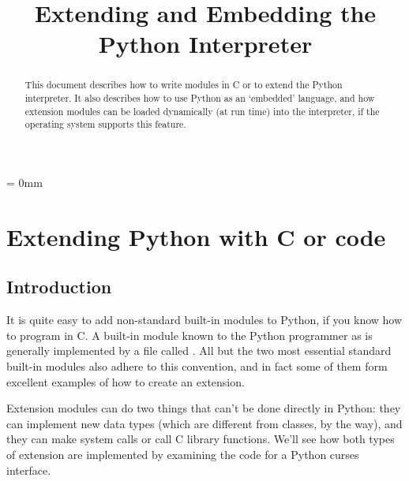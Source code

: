 
\title{Extending and Embedding the Python Interpreter}



\makeindex




\maketitle



\begin{abstract}

\noindent
This document describes how to write modules in C or \Cpp{} to extend the
Python interpreter.  It also describes how to use Python as an
`embedded' language, and how extension modules can be loaded
dynamically (at run time) into the interpreter, if the operating
system supports this feature.

\end{abstract}

\pagebreak

{
\parskip = 0mm
\tableofcontents
}

\pagebreak



\chapter{Extending Python with C or \Cpp{} code}


\section{Introduction}

It is quite easy to add non-standard built-in modules to Python, if
you know how to program in C.  A built-in module known to the Python
programmer as  is generally implemented by a file called
.  All but the two most essential standard built-in
modules also adhere to this convention, and in fact some of them form
excellent examples of how to create an extension.

Extension modules can do two things that can't be done directly in
Python: they can implement new data types (which are different from
classes, by the way), and they can make system calls or call C library
functions.   We'll see how both types of extension are implemented by
examining the code for a Python curses interface.

